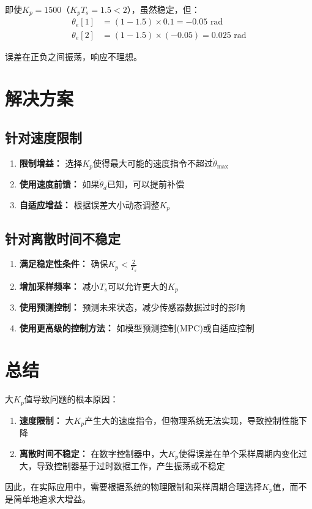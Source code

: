 \documentclass[12pt,a4paper]{article}
\begin{document}
即使$K_p = 1500$（$K_p T_s = 1.5 < 2$），虽然稳定，但：
\begin{align}
\theta_e[1] &= (1 - 1.5) \times 0.1 = -0.05 \text{ rad} \\
\theta_e[2] &= (1 - 1.5) \times (-0.05) = 0.025 \text{ rad}
\end{align}

误差在正负之间振荡，响应不理想。

\section{解决方案}

\subsection{针对速度限制}

\begin{enumerate}
\item \textbf{限制增益：} 选择$K_p$使得最大可能的速度指令不超过$\dot{\theta}_{\max}$
\item \textbf{使用速度前馈：} 如果$\dot{\theta}_d$已知，可以提前补偿
\item \textbf{自适应增益：} 根据误差大小动态调整$K_p$
\end{enumerate}

\subsection{针对离散时间不稳定}

\begin{enumerate}
\item \textbf{满足稳定性条件：} 确保$K_p < \frac{2}{T_s}$
\item \textbf{增加采样频率：} 减小$T_s$可以允许更大的$K_p$
\item \textbf{使用预测控制：} 预测未来状态，减少传感器数据过时的影响
\item \textbf{使用更高级的控制方法：} 如模型预测控制(MPC)或自适应控制
\end{enumerate}

\section{总结}

大$K_p$值导致问题的根本原因：

\begin{enumerate}
\item \textbf{速度限制：} 大$K_p$产生大的速度指令，但物理系统无法实现，导致控制性能下降
\item \textbf{离散时间不稳定：} 在数字控制器中，大$K_p$使得误差在单个采样周期内变化过大，导致控制器基于过时数据工作，产生振荡或不稳定
\end{enumerate}

因此，在实际应用中，需要根据系统的物理限制和采样周期合理选择$K_p$值，而不是简单地追求大增益。
\end{document}
